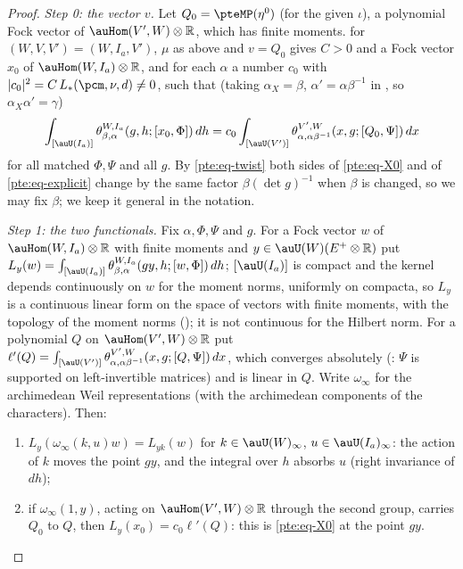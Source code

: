 \documentclass[10pt]{amsart}
\theoremstyle{definition}
\theoremstyle{remark}
\newcommand{\R}{\mathbb R}
\begin{document}
\begin{proof}
\emph{Step 0: the vector $v$.} Let $Q_0=\pteMP(\eta^0)$ (for the given $\iota$), a polynomial Fock
vector of $\auHom(V',W)\otimes\R$, which has finite moments. {\cite[Theorem~3.2]{P53}} for $(W,V,V')=(W,I_a,V')$,
$\mu$ as above and $v=Q_0$ gives $C>0$ and a Fock vector $x_0$ of $\auHom(W,I_a)\otimes\R$, and for each $\alpha$
a number $c_0$ with $|c_0|^2=C\,L_*(\pcm,\nu,d)\ne0$, such that (taking $\alpha_X=\beta$, $\alpha'=\alpha
\beta^{-1}$ in {\cite[(12)]{P53}}, so $\alpha_X\alpha'=\gamma$)
\begin{equation}\label{pte:eq-X0}
\int_{[\auU(I_a)]}\theta^{W,I_a}_{\beta,\alpha}(g,h;[x_0,\Phi])\,dh=c_0\int_{[\auU(V')]}
\theta^{V',W}_{\alpha,\alpha\beta^{-1}}(x,g;[Q_0,\Psi])\,dx
\end{equation}
for all matched $\Phi,\Psi$ and all $g$. By \eqref{pte:eq-twist} both sides of \eqref{pte:eq-X0} and of
\eqref{pte:eq-explicit} change by the same factor $\beta(\det g)^{-1}$ when $\beta$ is changed, so we
may fix $\beta$; we keep it general in the notation.

\emph{Step 1: the two functionals.} Fix $\alpha,\Phi,\Psi$ and $g$. For a Fock vector $w$ of
$\auHom(W,I_a)\otimes\R$ with finite moments and $y\in\auU(W)(E^+\otimes\R)$ put $L_y(w)=\int_{[\auU(I_a)]}
\theta^{W,I_a}_{\beta,\alpha}(gy,h;[w,\Phi])\,dh$; $[\auU(I_a)]$ is compact and the kernel depends
continuously on $w$ for the moment norms, uniformly on compacta, so $L_y$ is a continuous linear form on the space of vectors with finite moments,
with the topology of the moment norms ({\cite[Lemma~3.107]{P53}}); it is not continuous for the Hilbert norm. For a polynomial
$Q$ on $\auHom(V',W)\otimes\R$ put $\ell'(Q)=\int_{[\auU(V')]}\theta^{V',W}_{\alpha,\alpha\beta^{-1}}
(x,g;[Q,\Psi])\,dx$, which converges absolutely ({\cite[Corollary~3.34]{P53}}: $\Psi$ is supported on
left-invertible matrices) and is linear in $Q$. Write $\omega_\infty$ for the archimedean Weil
representations (with the archimedean components of the characters). Then:
\begin{enumerate}
\item[(a)] $L_y(\omega_\infty(k,u)w)=L_{yk}(w)$ for $k\in\auU(W)_\infty$, $u\in\auU(I_a)_\infty$: the
action of $k$ moves the point $gy$, and the integral over $h$ absorbs $u$ (right invariance of $dh$);
\item[(b)] if $\omega_\infty(1,y)$, acting on $\auHom(V',W)\otimes\R$ through the second group,
carries $Q_0$ to $Q$, then $L_y(x_0)=c_0\ell'(Q)$: this is \eqref{pte:eq-X0} at the point $gy$.
\end{enumerate}


\end{proof}
\end{document}
